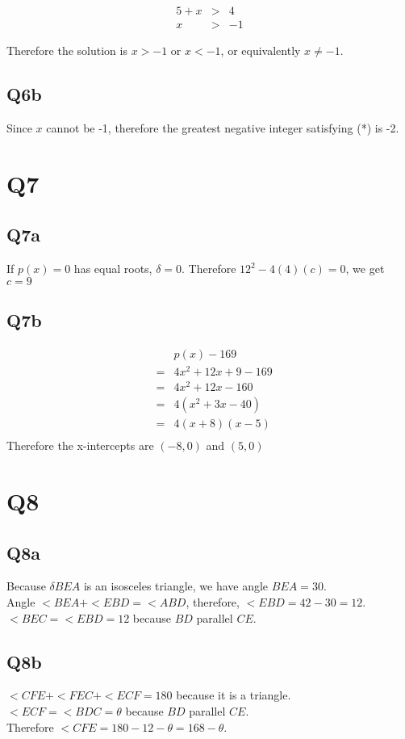 \documentclass{article}
\begin{document}
\begin{eqnarray*}
  5 + x &>& 4 \\
  x &>& -1
\end{eqnarray*}

Therefore the solution is $ x > -1 $ or $ x < -1$, or equivalently $ x \ne -1$.

\subsection{Q6b}
Since $ x $ cannot be -1, therefore the greatest negative integer satisfying (*) is -2.

\section{Q7}
\subsection{Q7a}
If $ p(x) = 0 $ has equal roots, $ \delta = 0$. Therefore $ 12^2 - 4(4)(c) = 0 $, we get $ c = 9 $

\subsection{Q7b}
\begin{eqnarray*}
  & & p(x) - 169 \\
  &=& 4x^2 + 12x + 9 - 169 \\
  &=& 4x^2 + 12x - 160 \\
  &=& 4(x^2 + 3x - 40) \\
  &=& 4(x + 8)(x - 5) \\
\end{eqnarray*}
Therefore the x-intercepts are $ (-8, 0) $ and $ (5, 0) $

\section{Q8}
\subsection{Q8a}
Because $ \delta BEA $ is an isosceles triangle, we have angle $ BEA = 30 $. \\
Angle $ <BEA + <EBD = <ABD $, therefore, $ <EBD = 42 - 30 = 12 $. \\
$ <BEC = < EBD = 12 $ because $ BD $ parallel $ CE $. \\

\subsection{Q8b}
$ < CFE + <FEC + <ECF = 180 $ because it is a triangle. \\
$ <ECF = <BDC = \theta $ because $ BD $ parallel $ CE$. \\
Therefore $ < CFE = 180 - 12 - \theta = 168 - \theta $.
\end{document}
